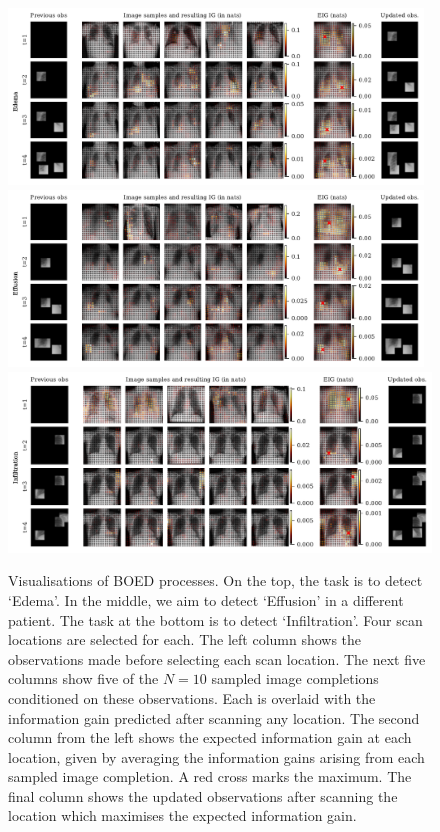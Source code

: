 \begin{figure}[p]
  \centering
  \includegraphics[width=0.98\textwidth]{figs/cigcvae/boed-visualisation-4960-compressed.pdf}
  \includegraphics[width=0.98\textwidth]{figs/cigcvae/boed-visualisation-4970-compressed.pdf}
  \includegraphics[width=\textwidth]{figs/cigcvae/boed-visualisation-4980-compressed.pdf}
  \caption{Visualisations of BOED processes. On the top, the task is to detect
    `Edema'. In the middle, we aim to detect `Effusion' in a different patient.
    The task at the bottom is to detect `Infiltration'. Four scan locations are
    selected for each. The left column shows the observations made before
    selecting each scan location. The next five columns show five of the $N=10$
    sampled image completions conditioned on these observations. Each is
    overlaid with the information gain predicted after scanning any location.
    The second column from the left shows the expected information gain at each
    location, given by averaging the information gains arising from each sampled
    image completion. A red cross marks the maximum. The final column shows the
    updated observations after scanning the location which maximises the
    expected information gain.}
  \label{fig:cigcvae-extra-xray-boed}
\end{figure}

